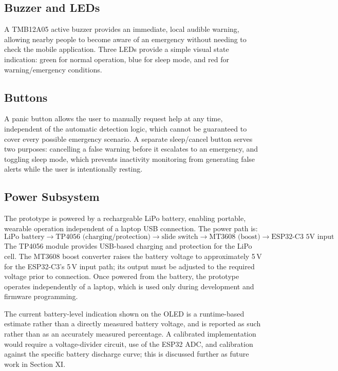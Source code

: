 \documentclass[lettersize,journal]{IEEEtran}
\begin{document}
\subsection{Buzzer and LEDs}
A TMB12A05 active buzzer provides an immediate, local audible warning, allowing nearby people to become aware of an emergency without needing to check the mobile application. Three LEDs provide a simple visual state indication: green for normal operation, blue for sleep mode, and red for warning/emergency conditions.

\subsection{Buttons}
A panic button allows the user to manually request help at any time, independent of the automatic detection logic, which cannot be guaranteed to cover every possible emergency scenario. A separate sleep/cancel button serves two purposes: cancelling a false warning before it escalates to an emergency, and toggling sleep mode, which prevents inactivity monitoring from generating false alerts while the user is intentionally resting.

\subsection{Power Subsystem}
The prototype is powered by a rechargeable LiPo battery, enabling portable, wearable operation independent of a laptop USB connection. The power path is:
\[
\text{LiPo battery} \rightarrow \text{TP4056 (charging/protection)} \rightarrow \text{slide switch} \rightarrow \text{MT3608 (boost)} \rightarrow \text{ESP32-C3 5V input}
\]
The TP4056 module provides USB-based charging and protection for the LiPo cell. The MT3608 boost converter raises the battery voltage to approximately 5\,V for the ESP32-C3's 5\,V input path; its output must be adjusted to the required voltage prior to connection. Once powered from the battery, the prototype operates independently of a laptop, which is used only during development and firmware programming.

The current battery-level indication shown on the OLED is a runtime-based estimate rather than a directly measured battery voltage, and is reported as such rather than as an accurately measured percentage. A calibrated implementation would require a voltage-divider circuit, use of the ESP32 ADC, and calibration against the specific battery discharge curve; this is discussed further as future work in Section XI.
\end{document}
